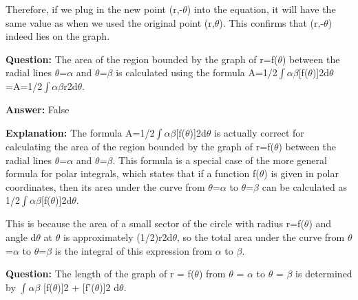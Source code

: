 \documentclass{article}
\begin{document}
Therefore, if we plug in the new point (r,-\ensuremath{\theta}) into the equation, it will have the same value as when we used the original point (r,\ensuremath{\theta}). This confirms that (r,-\ensuremath{\theta}) indeed lies on the graph.
                
                \vspace{0.5cm} 
        
            
                \textbf {Question:} The area of the region bounded by the graph of r=f(\ensuremath{\theta}) between the radial lines \ensuremath{\theta}=\ensuremath{\alpha} and \ensuremath{\theta}=\ensuremath{\beta} is calculated using the formula A=1/2\ensuremath{\int}\ensuremath{\alpha}\ensuremath{\beta}[f(\ensuremath{\theta})]2d\ensuremath{\theta}=A=1/2\ensuremath{\int}\ensuremath{\alpha}\ensuremath{\beta}r2d\ensuremath{\theta}.
                
                \textbf{Answer:} False

                \textbf{Explanation:} The formula A=1/2\ensuremath{\int}\ensuremath{\alpha}\ensuremath{\beta}[f(\ensuremath{\theta})]2d\ensuremath{\theta} is actually correct for calculating the area of the region bounded by the graph of r=f(\ensuremath{\theta}) between the radial lines \ensuremath{\theta}=\ensuremath{\alpha} and \ensuremath{\theta}=\ensuremath{\beta}. This formula is a special case of the more general formula for polar integrals, which states that if a function f(\ensuremath{\theta}) is given in polar coordinates, then its area under the curve from \ensuremath{\theta}=\ensuremath{\alpha} to \ensuremath{\theta}=\ensuremath{\beta} can be calculated as 1/2\ensuremath{\int}\ensuremath{\alpha}\ensuremath{\beta}[f(\ensuremath{\theta})]2d\ensuremath{\theta}.

This is because the area of a small sector of the circle with radius r=f(\ensuremath{\theta}) and angle d\ensuremath{\theta} at \ensuremath{\theta} is approximately (1/2)r2d\ensuremath{\theta}, so the total area under the curve from \ensuremath{\theta}=\ensuremath{\alpha} to \ensuremath{\theta}=\ensuremath{\beta} is the integral of this expression from \ensuremath{\alpha} to \ensuremath{\beta}.
                
                \vspace{0.5cm} 
        
            
                \textbf {Question:} The length of the graph of r = f(\ensuremath{\theta}) from \ensuremath{\theta} = \ensuremath{\alpha} to \ensuremath{\theta} = \ensuremath{\beta} is determined by \ensuremath{\int}\ensuremath{\alpha}\ensuremath{\beta} [f(\ensuremath{\theta})]2 + [f'(\ensuremath{\theta})]2 d\ensuremath{\theta}.
                
\end{document}
